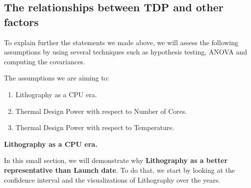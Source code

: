 \subsection{The relationships between TDP and other factors}


To explain further the statements we made above, we will assess the following assumptions by using several techniques such as 
hypothesis testing, ANOVA and computing the covariances.

The assumptions we are aiming to:
\begin{enumerate}
    \item Lithography as a CPU era.
    \item Thermal Design Power with respect to Number of Cores.
    \item Thermal Design Power with respect to Temperature.
\end{enumerate}











\textbf{Lithography as a CPU era.}

In this small section, we will demonstrate why \textbf{Lithography as a better representative than Launch date}. To do that, we start by looking at the confidence interval and the visualizations of Lithography over the years.

